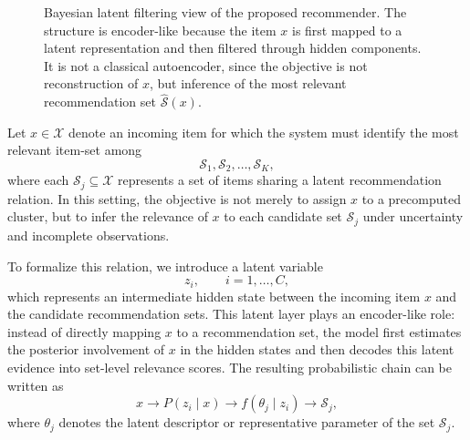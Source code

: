 \documentclass{article}
\begin{document}
\begin{figure}[t]
	\caption{Bayesian latent filtering view of the proposed recommender. The structure is encoder-like because the item \(x\) is first mapped to a latent representation and then filtered through hidden components. It is not a classical autoencoder, since the objective is not reconstruction of \(x\), but inference of the most relevant recommendation set \(\widehat{\mathcal{S}}(x)\).}
	\label{fig:bayesian_latent_filtering}
\end{figure}


























Let \(x\in\mathcal{X}\) denote an incoming item for which the system must identify the most relevant item-set among
\[
\mathcal{S}_1,\mathcal{S}_2,\ldots,\mathcal{S}_K,
\]
where each \(\mathcal{S}_j\subseteq\mathcal{X}\) represents a set of items sharing a latent recommendation relation. In this setting, the objective is not merely to assign \(x\) to a precomputed cluster, but to infer the relevance of \(x\) to each candidate set \(\mathcal{S}_j\) under uncertainty and incomplete observations.

To formalize this relation, we introduce a latent variable
\[
z_i,\qquad i=1,\ldots,C,
\]
which represents an intermediate hidden state between the incoming item \(x\) and the candidate recommendation sets. This latent layer plays an encoder-like role: instead of directly mapping \(x\) to a recommendation set, the model first estimates the posterior involvement of \(x\) in the hidden states and then decodes this latent evidence into set-level relevance scores. The resulting probabilistic chain can be written as
\[
x
\longrightarrow
P(z_i\mid x)
\longrightarrow
f(\theta_j\mid z_i)
\longrightarrow
\mathcal{S}_j,
\]
where \(\theta_j\) denotes the latent descriptor or representative parameter of the set \(\mathcal{S}_j\).
\end{document}

